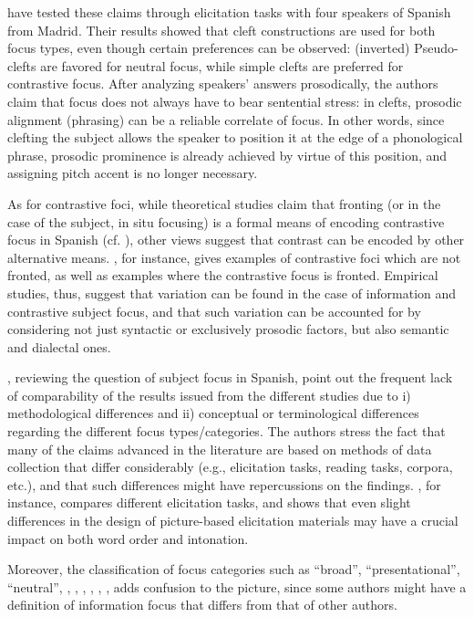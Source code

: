 \textcite{feldhausen2015oraciones} have tested these claims through elicitation tasks with four speakers of Spanish from Madrid. Their results showed that cleft constructions are used for both focus types, even though certain preferences can be observed: (inverted) Pseudo-clefts are favored for neutral focus, while simple clefts are preferred for contrastive focus. After analyzing speakers’ answers prosodically, the authors claim that focus does not always have to bear sentential stress: in clefts, prosodic alignment (phrasing) can be a reliable correlate of focus. In other words, since clefting the subject allows the speaker to position it at the edge of a phonological phrase, prosodic prominence is already achieved by virtue of this position, and assigning pitch accent is no longer necessary.

As for contrastive foci, while theoretical studies claim that fronting (or in the case of the subject, in situ focusing) is a formal means of encoding contrastive focus in Spanish (cf. \cite{zubizarreta1998prosody}), other views suggest that contrast can be encoded by other alternative means. \textcite{brunetti2009italian}, for instance, gives  examples  of  contrastive  foci  which  are  not fronted, as well as examples where the contrastive focus is fronted. 
Empirical studies, thus, suggest that variation can be found in the case of information and contrastive subject focus, and that such variation can be accounted for by considering not just syntactic or exclusively prosodic factors, but also semantic and dialectal ones.

\textcite{garcia2018introduction}, reviewing the question of subject focus in Spanish, point out the frequent lack of comparability of the results issued from the different studies due to i) methodological differences and ii) conceptual or terminological differences regarding the different focus types/categories. The authors stress the fact that many of the claims advanced in the literature are based on methods of data collection that differ considerably (e.g., elicitation tasks, reading tasks, corpora, etc.), and that such differences might have repercussions on the findings.
\textcite{uth2014spanish}, for instance, compares different elicitation tasks, and shows that even slight differences in the design of picture-based elicitation materials may have a crucial impact on both word order and intonation.

Moreover, the classification of focus categories such as ``broad”, ``presentational”, ``neutral”, , , , , , ,  adds confusion to the picture, since some authors might have a definition of information focus that differs from that of other authors.

